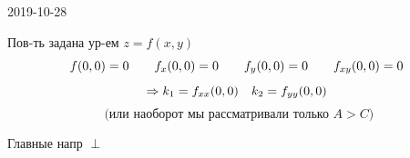 \documentclass[main]{subfiles}
\begin{document}
\begin{lect}{2019-10-28}
      \begin{consequence}[1]
          Пов-ть задана ур-ем $z = f(x, y)$
          \[f(0, 0) = 0 \qquad f_x(0, 0) = 0 \qquad f_y(0, 0) = 0 \qquad f_{xy}(0, 0) = 0 \]
          \[\Rightarrow k_1 = f_{xx}(0, 0) \quad k_2 = f_{yy} (0, 0)\]
          \[\text{ (или наоборот мы
          рассматривали только } A > C)\]
      \end{consequence}

      \begin{consequence}[2]
          Главные напр $\perp$
      \end{consequence}
  \end{lect}
\end{document}
